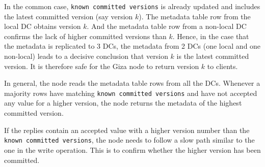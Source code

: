 In the common case, {\tt known committed versions} is already updated and
includes the latest committed version (say version $k$). The metadata table row
from the local DC obtains version $k$. And the metadata table row from a
non-local DC confirms the lack of higher committed versions than $k$. Hence, in
the case that the metadata is replicated to 3 DCs, the metadata from 2 DCs (one
local and one non-local) leads to a decisive conclusion that version $k$ is the
latest committed version. It is therefore safe for the Giza node to return
version $k$ to clients.

In general, the \name node reads the metadata table rows from all the DCs.
Whenever a majority rows have matching {\tt known committed versions} and have
not accepted any value for a higher version, the \name node returns the metadata
of the highest committed version.

If the replies contain an accepted value with a higher version number than the
{\tt known committed versions}, the \name node needs to follow a slow path
similar to the one in the write operation. This is to confirm whether the higher
version has been committed.




